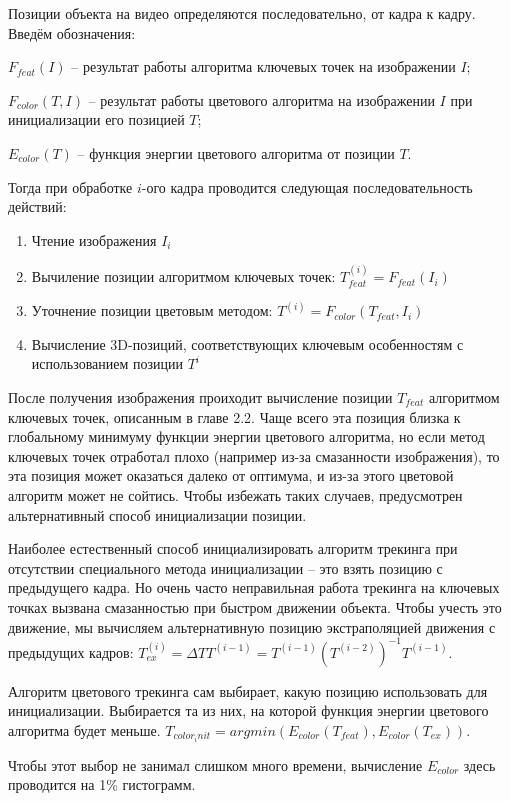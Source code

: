 Позиции объекта на видео определяются последовательно, от кадра к кадру.
Введём обозначения:

$F_{feat}(I)$ -- результат работы алгоритма ключевых точек на изображении $I$; 

$F_{color}(T, I)$ -- результат работы цветового алгоритма на изображении $I$
при инициализации его позицией $T$;

$E_{color}(T)$ -- функция энергии цветового алгоритма от позиции $T$.

Тогда при обработке $i$-ого кадра проводится следующая последовательность
действий:

\begin{enumerate}
\item Чтение изображения $I_i$
\item Вычиление позиции алгоритмом ключевых точек:
    $T_{feat}^{(i)} = F_{feat}(I_i)$
\item Уточнение позиции цветовым методом:
    $T^{(i)} = F_{color}(T_{feat}, I_i)$
\item Вычисление  3D-позиций, соответствующих ключевым особенностям с
    использованием позиции $T^i$
\end{enumerate}

После получения изображения проиходит вычисление позиции $T_{feat}$ алгоритмом
ключевых точек, описанным в главе 2.2. %
Чаще всего эта позиция близка к глобальному минимуму функции энергии цветового
алгоритма, но если метод ключевых точек отработал плохо (например из-за
смазанности изображения), то эта позиция может оказаться далеко от оптимума, и
из-за этого цветовой алгоритм может не сойтись.
Чтобы избежать таких случаев, предусмотрен альтернативный способ инициализации
позиции.

Наиболее естественный способ инициализировать алгоритм трекинга при отсутствии
специального метода инициализации -- это взять позицию с предыдущего кадра.
Но очень часто неправильная работа трекинга на ключевых точках вызвана
смазанностью при быстром движении объекта.
Чтобы учесть это движение, мы вычисляем альтернативную позицию экстраполяцией
движения с предыдущих кадров:
$
    T^{(i)}_{ex} = \Delta T T^{(i - 1)} = T^{(i - 1)}(T^{(i - 2)})^{-1} T^{(i - 1)}
$.

Алгоритм цветового трекинга сам выбирает, какую позицию использовать для
инициализации.
Выбирается та из них, на которой функция энергии цветового
алгоритма будет меньше.
$
    T_{color_init} = argmin(E_{color}(T_{feat}), E_{color}(T_{ex}))
$.

Чтобы этот выбор не занимал слишком много времени, вычисление $E_{color}$ здесь
проводится на 1\% гистограмм.

